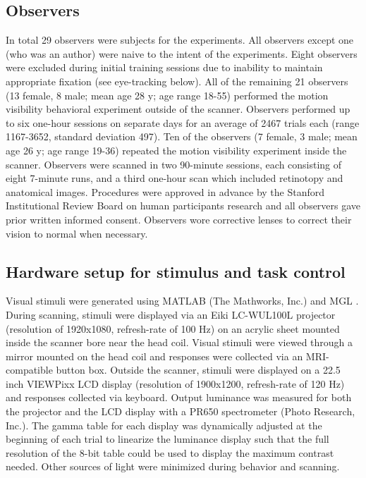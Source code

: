 \subsection{Observers}
In total 29 observers were subjects for the experiments. All observers except one (who was an author) were naive to the intent of the experiments. Eight observers were excluded during initial training sessions due to inability to maintain appropriate fixation (see eye-tracking below). All of the remaining 21 observers (13 female, 8 male; mean age 28 y; age range 18-55) performed the motion visibility behavioral experiment outside of the scanner. Observers performed up to six one-hour sessions on separate days for an average of 2467 trials each (range 1167-3652, standard deviation 497). Ten of the observers (7 female, 3 male; mean age 26 y; age range 19-36) repeated the motion visibility experiment inside the scanner. Observers were scanned in two 90-minute sessions, each consisting of eight 7-minute runs, and a third one-hour scan which included retinotopy and anatomical images. Procedures were approved in advance by the Stanford Institutional Review Board on human participants research and all observers gave prior written informed consent. Observers wore corrective lenses to correct their vision to normal when necessary.

\subsection{Hardware setup for stimulus and task control}

Visual stimuli were generated using MATLAB (The Mathworks, Inc.) and MGL \citep{Gardner2018-uq}. During scanning, stimuli were displayed via an Eiki LC-WUL100L projector (resolution of 1920x1080, refresh-rate of 100 Hz) on an acrylic sheet mounted inside the scanner bore near the head coil. Visual stimuli were viewed through a mirror mounted on the head coil and responses were collected via an MRI-compatible button box. Outside the scanner, stimuli were displayed on a 22.5 inch VIEWPixx LCD display (resolution of 1900x1200, refresh-rate of 120 Hz) and responses collected via keyboard. Output luminance was measured for both the projector and the LCD display with a PR650 spectrometer (Photo Research, Inc.). The gamma table for each display was dynamically adjusted at the beginning of each trial to linearize the luminance display such that the full resolution of the 8-bit table could be used to display the maximum contrast needed. Other sources of light were minimized during behavior and scanning.

